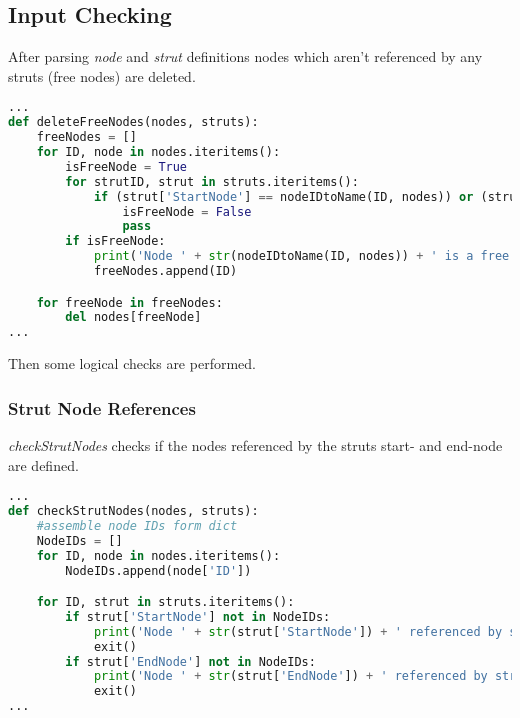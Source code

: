 \subsection{Input Checking}
\label{sec:inputcheck}

After parsing \textit{node} and \textit{strut} definitions nodes which aren't referenced by any struts (free nodes) are deleted. 

\begin{inconsolata}
\begin{minipage}{\linewidth}
\begin{lstlisting}[language=python]
...
def deleteFreeNodes(nodes, struts):
    freeNodes = []
    for ID, node in nodes.iteritems():
        isFreeNode = True
        for strutID, strut in struts.iteritems():
            if (strut['StartNode'] == nodeIDtoName(ID, nodes)) or (strut['EndNode'] == nodeIDtoName(ID, nodes)):
                isFreeNode = False
                pass
        if isFreeNode:
            print('Node ' + str(nodeIDtoName(ID, nodes)) + ' is a free node and will be deleted.')
            freeNodes.append(ID)

    for freeNode in freeNodes:
        del nodes[freeNode]
...
\end{lstlisting}
\end{minipage}
\end{inconsolata}

Then some logical checks are performed.

\subsubsection{Strut Node References}
\label{sec:inputcheck-checkStrutNodes}

\textit{checkStrutNodes} checks if the nodes referenced by the struts start- and end-node are defined.

\begin{inconsolata}
\begin{minipage}{\linewidth}
\begin{lstlisting}[language=python]
...
def checkStrutNodes(nodes, struts):
    #assemble node IDs form dict
    NodeIDs = []
    for ID, node in nodes.iteritems():
        NodeIDs.append(node['ID'])

    for ID, strut in struts.iteritems():
        if strut['StartNode'] not in NodeIDs:
            print('Node ' + str(strut['StartNode']) + ' referenced by strut ' + str(strut['ID']) + ' but not defined.')
            exit()
        if strut['EndNode'] not in NodeIDs:
            print('Node ' + str(strut['EndNode']) + ' referenced by strut ' + str(strut['ID']) + ' but not defined.')
            exit()
...
\end{lstlisting}
\end{minipage}
\end{inconsolata}

